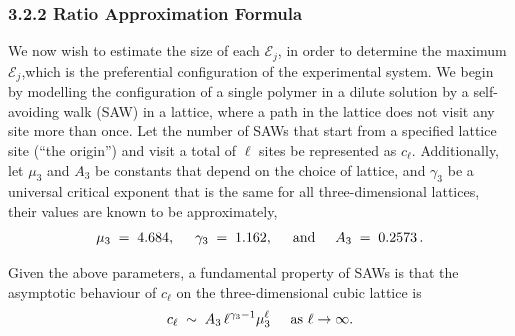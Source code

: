 \documentclass[journal=mamobx,manuscript=article]{achemso}
\begin{document}
\subsubsection{3.2.2 Ratio Approximation Formula}
We now wish to estimate the size of each $\mathcal{E}_j$, in order to  determine the maximum $\mathcal{E}_j$,which is the preferential configuration of the experimental system. We begin by modelling the configuration of a single  polymer in a dilute solution by a self-avoiding walk (SAW) in a lattice, where a path in the lattice does not visit any site more than once.
Let the number of SAWs that start from a specified lattice site (``the origin'') and visit a total of $\ell$ sites be represented as $c_{\ell}$. Additionally, let $\mu_3$ and $A_3$ be constants that depend on the choice of lattice, and $\gamma_3$ be a universal critical exponent that is the same for all three-dimensional lattices, their values are known to be approximately, \cite{Chen2002,Madras2013}  
\begin{equation}
   \label{eq.gammas}   \mu_3 \;=\;  4.684, \hspace{5mm}
        \gamma_3 \;=\;  1.162,    \hspace{5mm}\hbox{and}\hspace{5mm}
    A_3  \;=\;    0.2573  \,.  %
\end{equation}

\noindent Given the above parameters, a fundamental property of SAWs is that the asymptotic behaviour of $c_{\ell}$ on the three-dimensional cubic lattice is 
\begin{equation}
    \label{eq.sawscale}
       c_{\ell}  \;\sim  \;  A_3 \, {\ell}^{\gamma_3-1}  \mu_3^{\ell}    \hspace{5mm}\hbox{as $\ell\rightarrow\infty$}.
\end{equation}
\end{document}

